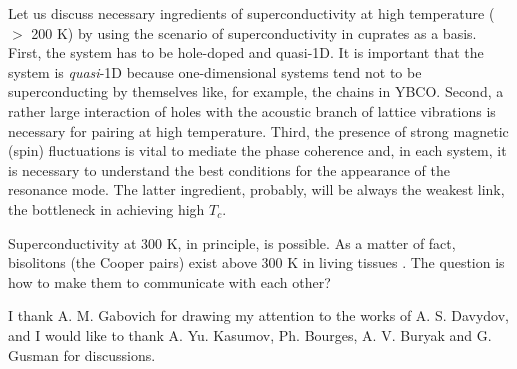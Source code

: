 Let us discuss necessary ingredients of superconductivity at high 
temperature ($>$ 200 K) by using the scenario of superconductivity in 
cuprates as a basis. First, the system has to be hole-doped and quasi-1D.
It is important that the system is {\em quasi}-1D because one-dimensional 
systems tend not to be superconducting by themselves \cite{Emery2} like, 
for example, the chains in YBCO. Second, a rather large interaction of holes 
with the acoustic branch of lattice vibrations is necessary for pairing at high 
temperature. Third, the presence of strong magnetic (spin) fluctuations is 
vital to mediate the phase coherence and, 
in each system, it is necessary to understand the best conditions for the 
appearance of the resonance mode. The latter ingredient, probably, will be 
always the weakest link, the bottleneck in achieving high $T_{c}$. 

Superconductivity at 300 K, in principle, is possible. As a matter of fact, 
bisolitons (the Cooper pairs) exist above 300 K in living tissues 
\cite{Davydov1,Davydov3}. The question is how to make them to 
communicate with each other? 

\acknowledgments
I thank A. M. Gabovich for drawing my attention to the works 
of A. S. Davydov, and I would like to thank A. Yu. Kasumov, Ph. Bourges, 
A. V. Buryak and G. Gusman for discussions. 

